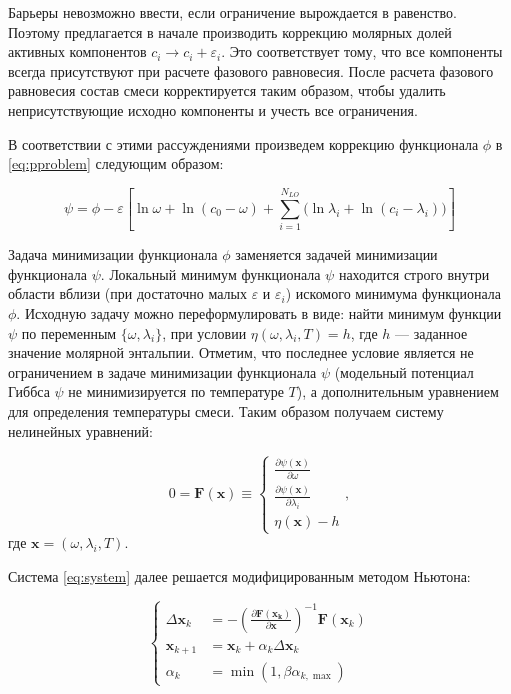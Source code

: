 \documentclass[12pt]{article}
\newcommand{\pd}[2]{\frac{\partial #1}{\partial #2}}
\renewcommand{\epsilon}{\varepsilon}
\begin{document}
Барьеры невозможно ввести, если ограничение вырождается в равенство. Поэтому предлагается в начале производить коррекцию молярных долей активных компонентов $c_i \rightarrow c_i + \epsilon_i$. Это соответствует тому, что все компоненты всегда присутствуют при расчете фазового равновесия. После расчета фазового равновесия состав смеси корректируется таким образом, чтобы удалить неприсутствующие исходно компоненты и учесть все ограничения. 

В соответствии с этими рассуждениями произведем коррекцию функционала $\phi$ в \eqref{eq:pproblem} следующим образом:

\begin{equation}
\psi = \phi - \varepsilon \left[ \ln \omega + \ln (c_0 - \omega) + \sum_{i=1}^{N_{LO}} \Big( \ln \lambda_i + \ln (c_i - \lambda_i) \Big) \right]
\end{equation}

Задача минимизации функционала $\phi$ заменяется задачей минимизации функционала $\psi$. Локальный минимум функционала $\psi$ находится строго внутри области вблизи (при достаточно малых $\epsilon$ и $\epsilon_i$) искомого минимума функционала $\phi$. Исходную задачу можно переформулировать в виде: найти минимум функции $\psi$ по переменным $\{\omega, \lambda_i\}$, при условии $\eta(\omega, \lambda_i, T) = h$, где $h$ --- заданное значение молярной энтальпии. Отметим, что последнее условие является не ограничением в задаче минимизации функционала $\psi$ (модельный потенциал Гиббса $\psi$ не минимизируется по температуре $T$), а дополнительным уравнением для определения температуры смеси. Таким образом получаем систему нелинейных уравнений:

\begin{equation}
0 = \mathbf{F}(\mathbf{x}) \equiv
\begin{cases}
 \pd{\psi(\mathbf{x})}{\omega}\\
 \pd{\psi(\mathbf{x})}{\lambda_i}\\
 \eta(\mathbf{x}) - h
\end{cases},
\label{eq:system}
\end{equation}
где $\mathbf{x} = (\omega, \lambda_i, T)$.

Система \eqref{eq:system} далее решается модифицированным методом Ньютона:

\begin{equation}
\left\{
\begin{aligned}
\Delta \mathbf{x}_k &= -\left(\pd{\mathbf{F(\mathbf{x}_k)}}{\mathbf{x}}\right)^{-1}
\mathbf{F}(\mathbf{x}_k)\\
\mathbf{x}_{k+1} &= \mathbf{x}_k + \alpha_k \Delta \mathbf{x}_k\\
\alpha_k &= \min(1, \beta \alpha_{k, \max})
\end{aligned}
\right. \label{eq:newton}
\end{equation}
\end{document}
